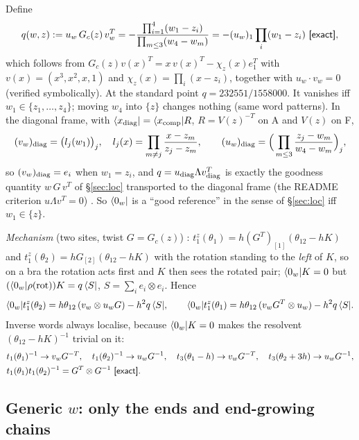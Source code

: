 Define
\begin{equation}
 q(w,z):=u_w\,G_c(z)\,v_w^T=-\frac{\prod_{i=1}^4(w_1-z_i)}{\prod_{m\le3}(w_4-w_m)}=-(u_w)_1\prod_i(w_1-z_i)\ \ex,
\end{equation}
which follows from $G_c(z)v(x)^T=x\,v(x)^T-\chi_z(x)e_1^T$ with $v(x)=(x^3,x^2,x,1)$ and $\chi_z(x)=\prod_i(x-z_i)$, together with $u_w\cdot v_w=0$
(verified symbolically). At the standard point $q=232551/1558000$. It vanishes iff $w_1\in\{z_1,\dots,z_4\}$; moving $w_4$ into $\{z\}$ changes nothing
(same word patterns). In the diagonal frame, with $\langle x_{\rm diag}|=\langle x_{\rm comp}|R$, $R=V(z)^{-T}$ on A and $V(z)$ on F,
\begin{equation}
 (v_w)_{\rm diag}=\big(l_j(w_1)\big)_j,\quad l_j(x)=\prod_{m\ne j}\frac{x-z_m}{z_j-z_m},\qquad
 (u_w)_{\rm diag}=\Big(\prod_{m\le3}\frac{z_j-w_m}{w_4-w_m}\Big)_j,
\end{equation}
so $(v_w)_{\rm diag}=e_i$ when $w_1=z_i$, and $q=u_{\rm diag}\Lambda v_{\rm diag}^T$ is exactly the goodness quantity $w\,G\,v^T$ of \S\ref{sec:loc}
transported to the diagonal frame (the README criterion $u\Lambda v^T=0$) \ex. So $\langle0_w|$ is a ``good reference'' in the sense of \S\ref{sec:loc}
iff $w_1\in\{z\}$.

\emph{Mechanism} (two sites, twist $G=G_c(z)$) \ex: $t_1^z(\theta_1)=h(G^T)_{[1]}(\theta_{12}-hK)$ and $t_1^z(\theta_2)=hG_{[2]}(\theta_{12}-hK)$ with the rotation standing to
the \emph{left} of $K$, so on a bra the rotation acts first and $K$ then sees the rotated pair; $\langle0_w|K=0$ but $(\langle0_w|\rho(\text{rot}))K=q\,\langle S|$,
$S=\sum_ie_i\otimes e_i$. Hence
\begin{equation}
 \langle0_w|t_1^z(\theta_2)=h\theta_{12}\,(v_w\otimes u_wG)-h^2q\,\langle S|,\qquad
 \langle0_w|t_1^z(\theta_1)=h\theta_{12}\,(v_wG^T\otimes u_w)-h^2q\,\langle S| .
\end{equation}
Inverse words always localise, because $\langle0_w|K=0$ makes the resolvent $(\theta_{12}-hK)^{-1}$ trivial on it:
\begin{align}
 &t_1(\theta_1)^{-1}\to v_wG^{-T},\quad t_1(\theta_2)^{-1}\to u_wG^{-1},\quad t_3(\theta_1-h)\to v_wG^{-T},\quad t_3(\theta_2+3h)\to u_wG^{-1},\nonumber\\
 &t_1(\theta_1)t_1(\theta_2)^{-1}=G^T\otimes G^{-1}\ \textsf{[exact]}.
\end{align}

\subsection{Generic \texorpdfstring{$w$}{w}: only the ends and end-growing chains}\label{sec:twvac-generic}

